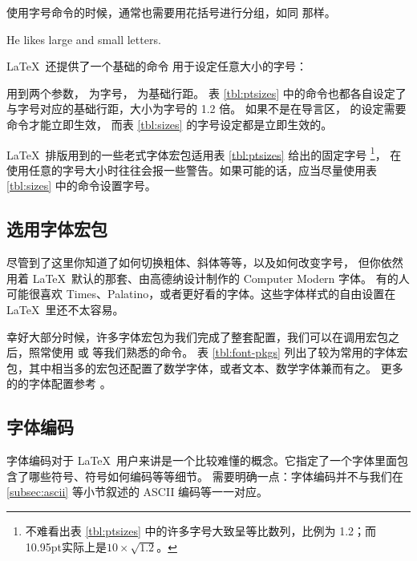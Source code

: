 使用字号命令的时候，通常也需要用花括号进行分组，如同  那样。
\begin{example}
He likes {\LARGE large and
{\small small} letters}.
\end{example}

\LaTeX\ 还提供了一个基础的命令  用于设定任意大小的字号：
\begin{command}
\end{command}

 用到两个参数， 为字号， 为基础行距。
表 \ref{tbl:ptsizes} 中的命令也都各自设定了与字号对应的基础行距，大小为字号的 1.2 倍。
如果不是在导言区， 的设定需要  命令才能立即生效，
而表 \ref{tbl:sizes} 的字号设定都是立即生效的。

\LaTeX\ 排版用到的一些老式字体宏包适用表 \ref{tbl:ptsizes} 给出的固定字号%
\footnote{不难看出表 \ref{tbl:ptsizes} 中的许多字号大致呈等比数列，比例为 1.2；而10.95pt实际上是$10\times\sqrt{1.2}$。}，
在使用任意的字号大小时往往会报一些警告。如果可能的话，应当尽量使用表 \ref{tbl:sizes} 中的命令设置字号。

\subsection{选用字体宏包}\label{subsec:font-pkgs}

尽管到了这里你知道了如何切换粗体、斜体等等，以及如何改变字号，
但你依然用着 \LaTeX\ 默认的那套、由高德纳设计制作的 Computer Modern 字体。
有的人可能很喜欢 Times、Palatino，或者更好看的字体。这些字体样式的自由设置在 \LaTeX\ 里还不太容易。

幸好大部分时候，许多字体宏包为我们完成了整套配置，我们可以在调用宏包之后，照常使用  或  等我们熟悉的命令。
表 \ref{tbl:font-pkgs} 列出了较为常用的字体宏包，其中相当多的宏包还配置了数学字体，或者文本、数学字体兼而有之。
更多的的字体配置参考 \cite{survey,fontcatalogue}。

\subsection{字体编码}\label{subsec:font-encs}

字体编码对于 \LaTeX\ 用户来讲是一个比较难懂的概念。它指定了一个字体里面包含了哪些符号、符号如何编码等等细节。
需要明确一点：字体编码并不与我们在 \ref{subsec:ascii} 等小节叙述的 ASCII 编码等一一对应。

